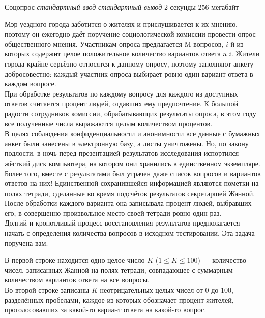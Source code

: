 \begin{problem}%
{Соцопрос}%
{\textsl{стандартный ввод}}%
{\textsl{стандартный вывод}}%
{2 секунды}%
{256 мегабайт}{}

Мэр уездного города заботится о жителях и прислушивается к их мнению, поэтому он ежегодно даёт поручение социологической комиссии провести опрос общественного мнения. Участникам опроса предлагается M вопросов, $i$-й из которых содержит целое положительное количество вариантов ответа a $i$. Жители города крайне серьёзно относятся к данному опросу, поэтому заполняют анкету добросовестно: каждый участник опроса выбирает ровно один вариант ответа в каждом вопросе.\\

При обработке результатов по каждому вопросу для каждого из доступных ответов считается процент людей, отдавших ему предпочтение. К большой радости сотрудников комиссии, обрабатывающих результаты опроса, в этом году все полученные числа выражаются целым количеством процентов.\\

В целях соблюдения конфиденциальности и анонимности все данные с бумажных анкет были занесены в электронную базу, а листы уничтожены. Но, по закону подлости, в ночь перед презентацией результатов исследования испортился жёсткий диск компьютера, на котором они хранились в единственном экземпляре. Более того, вместе с результатами был утрачен даже список вопросов и вариантов ответов на них! Единственной сохранившейся информацией являются пометки на полях тетради, сделанные во время подсчётов результатов секретаршей Жанной. После обработки каждого варианта она записывала процент людей, выбравших его, в совершенно произвольное место своей тетради ровно один раз.\\

Долгий и кропотливый процесс восстановления результатов предполагается начать с определения количества вопросов в исходном тестировании. Эта задача поручена вам.

\InputFile

В первой строке находится одно целое число $K$ ($1 \le K \le 100$) — количество чисел, записанных Жанной на полях тетради, совпадающее с суммарным количеством вариантов ответа на все вопросы.\\

Во второй строке записаны $K$ неотрицательных целых чисел от 0 до 100, разделённых пробелами, каждое из которых обозначает процент жителей, проголосовавших за какой-то вариант ответа на какой-то вопрос.


\end{problem}
